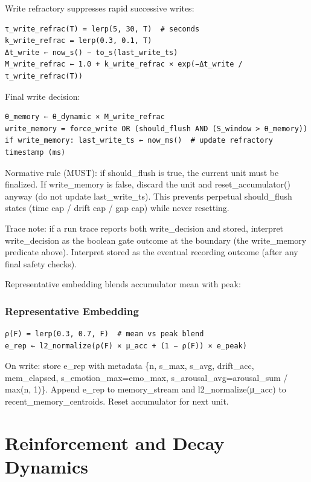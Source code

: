 \documentclass[
  letterpaper,
  DIV=11,
  numbers=noendperiod]{scrartcl}
\begin{document}
Write refractory suppresses rapid successive writes:

\begin{verbatim}
τ_write_refrac(T) = lerp(5, 30, T)  # seconds
k_write_refrac = lerp(0.3, 0.1, T)
Δt_write ← now_s() − to_s(last_write_ts)
M_write_refrac ← 1.0 + k_write_refrac × exp(−Δt_write / τ_write_refrac(T))
\end{verbatim}

Final write decision:

\begin{verbatim}
θ_memory ← θ_dynamic × M_write_refrac
write_memory = force_write OR (should_flush AND (S_window > θ_memory))
if write_memory: last_write_ts ← now_ms()  # update refractory timestamp (ms)
\end{verbatim}

Normative rule (MUST): if should\_flush is true, the current unit must
be finalized. If write\_memory is false, discard the unit and
reset\_accumulator() anyway (do not update last\_write\_ts). This
prevents perpetual should\_flush states (time cap / drift cap / gap cap)
while never resetting.

Trace note: if a run trace reports both write\_decision and stored,
interpret write\_decision as the boolean gate outcome at the boundary
(the write\_memory predicate above). Interpret stored as the eventual
recording outcome (after any final safety checks).

Representative embedding blends accumulator mean with peak:

\subsubsection{Representative Embedding}\label{sec-rep-embedding}

\begin{verbatim}
ρ(F) = lerp(0.3, 0.7, F)  # mean vs peak blend
e_rep ← l2_normalize(ρ(F) × μ_acc + (1 − ρ(F)) × e_peak)
\end{verbatim}

On write: store e\_rep with metadata \{n, s\_max, s\_avg, drift\_acc,
mem\_elapsed, s\_emotion\_max=emo\_max, s\_arousal\_avg=arousal\_sum /
max(n, 1)\}. Append e\_rep to memory\_stream and l2\_normalize(μ\_acc)
to recent\_memory\_centroids. Reset accumulator for next unit.

\section{Reinforcement and Decay Dynamics}\label{sec-reinforcement}
\end{document}
